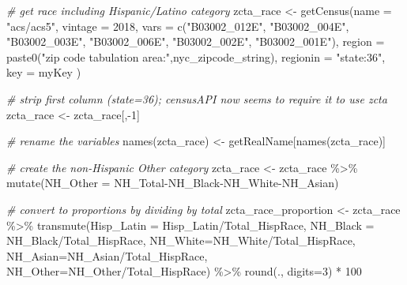 \documentclass[
  openany]{book}
\newenvironment{Shaded}{\begin{snugshade}}{\end{snugshade}}
\newcommand{\AttributeTok}[1]{\textcolor[rgb]{0.77,0.63,0.00}{#1}}
\newcommand{\CommentTok}[1]{\textcolor[rgb]{0.56,0.35,0.01}{\textit{#1}}}
\newcommand{\DecValTok}[1]{\textcolor[rgb]{0.00,0.00,0.81}{#1}}
\newcommand{\FunctionTok}[1]{\textcolor[rgb]{0.00,0.00,0.00}{#1}}
\newcommand{\NormalTok}[1]{#1}
\newcommand{\OtherTok}[1]{\textcolor[rgb]{0.56,0.35,0.01}{#1}}
\newcommand{\SpecialCharTok}[1]{\textcolor[rgb]{0.00,0.00,0.00}{#1}}
\newcommand{\StringTok}[1]{\textcolor[rgb]{0.31,0.60,0.02}{#1}}
\begin{document}
\begin{Shaded}
\begin{Highlighting}[]
\CommentTok{\# get race including Hispanic/Latino category}
\NormalTok{zcta\_race }\OtherTok{\textless{}{-}} \FunctionTok{getCensus}\NormalTok{(}\AttributeTok{name =} \StringTok{"acs/acs5"}\NormalTok{,}
                       \AttributeTok{vintage =} \DecValTok{2018}\NormalTok{,}
                       \AttributeTok{vars =} \FunctionTok{c}\NormalTok{(}\StringTok{"B03002\_012E"}\NormalTok{, }\StringTok{"B03002\_004E"}\NormalTok{, }
                                \StringTok{"B03002\_003E"}\NormalTok{, }\StringTok{"B03002\_006E"}\NormalTok{,}
                                \StringTok{"B03002\_002E"}\NormalTok{, }\StringTok{"B03002\_001E"}\NormalTok{),}
                       \AttributeTok{region =} \FunctionTok{paste0}\NormalTok{(}\StringTok{"zip code tabulation area:"}\NormalTok{,nyc\_zipcode\_string),}
                       \AttributeTok{regionin =} \StringTok{"state:36"}\NormalTok{,}
                       \AttributeTok{key =}\NormalTok{ myKey}
\NormalTok{                       )}

\CommentTok{\# strip first column (state=36); censusAPI now seems to require it to use zcta}
\NormalTok{zcta\_race }\OtherTok{\textless{}{-}}\NormalTok{ zcta\_race[,}\SpecialCharTok{{-}}\DecValTok{1}\NormalTok{]}

\CommentTok{\# rename the variables}
\FunctionTok{names}\NormalTok{(zcta\_race) }\OtherTok{\textless{}{-}}\NormalTok{ getRealName[}\FunctionTok{names}\NormalTok{(zcta\_race)]}

\CommentTok{\# create the non{-}Hispanic Other category}
\NormalTok{zcta\_race }\OtherTok{\textless{}{-}}\NormalTok{ zcta\_race }\SpecialCharTok{\%\textgreater{}\%} \FunctionTok{mutate}\NormalTok{(}\AttributeTok{NH\_Other =}\NormalTok{ NH\_Total}\SpecialCharTok{{-}}\NormalTok{NH\_Black}\SpecialCharTok{{-}}\NormalTok{NH\_White}\SpecialCharTok{{-}}\NormalTok{NH\_Asian) }

\CommentTok{\# convert to proportions by dividing by total}
\NormalTok{zcta\_race\_proportion }\OtherTok{\textless{}{-}}\NormalTok{ zcta\_race  }\SpecialCharTok{\%\textgreater{}\%} \FunctionTok{transmute}\NormalTok{(}\AttributeTok{Hisp\_Latin =}\NormalTok{ Hisp\_Latin}\SpecialCharTok{/}\NormalTok{Total\_HispRace, }
                                                 \AttributeTok{NH\_Black =}\NormalTok{ NH\_Black}\SpecialCharTok{/}\NormalTok{Total\_HispRace,}
                                                 \AttributeTok{NH\_White=}\NormalTok{NH\_White}\SpecialCharTok{/}\NormalTok{Total\_HispRace,}
                                                 \AttributeTok{NH\_Asian=}\NormalTok{NH\_Asian}\SpecialCharTok{/}\NormalTok{Total\_HispRace,}
                                                 \AttributeTok{NH\_Other=}\NormalTok{NH\_Other}\SpecialCharTok{/}\NormalTok{Total\_HispRace) }\SpecialCharTok{\%\textgreater{}\%}
                                      \FunctionTok{round}\NormalTok{(., }\AttributeTok{digits=}\DecValTok{3}\NormalTok{) }\SpecialCharTok{*} \DecValTok{100}


\end{Highlighting}
\end{Shaded}
\end{document}
